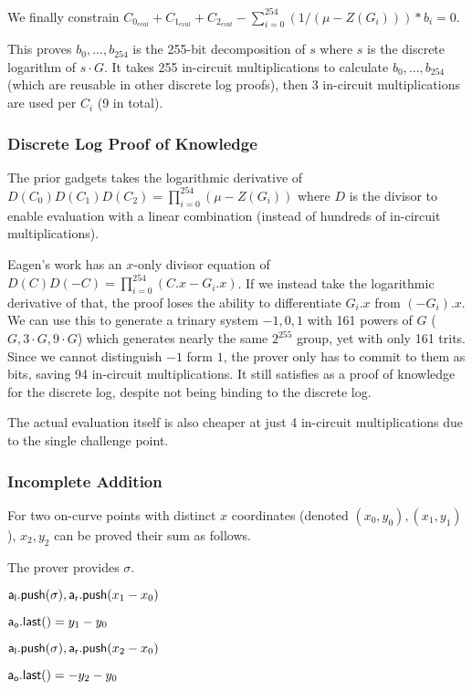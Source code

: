 \documentclass[]{article}
\begin{document}
We finally constrain $C_{0_{eval}} + C_{1_{eval}} + C_{2_{eval}} - \sum_{i=0}^{254} (1 / (\mu - Z(G_i))) * b_i = 0$.

This proves $b_0, ..., b_{254}$ is the 255-bit decomposition of $s$ where $s$ is the discrete logarithm of $s \cdot G$. It takes 255 in-circuit multiplications to calculate $b_0, ..., b_{254}$ (which are reusable in other discrete log proofs), then 3 in-circuit multiplications are used per $C_i$ (9 in total).

\subsubsection{Discrete Log Proof of Knowledge}

The prior gadgets takes the logarithmic derivative of $D(C_0)D(C_1)D(C_2) = \prod_{i=0}^{254}(\mu - Z(G_i))$ where $D$ is the divisor to enable evaluation with a linear combination (instead of hundreds of in-circuit multiplications).

Eagen's work has an $x$-only divisor equation of $D(C)D(-C) = \prod_{i=0}^{254}(C.x - G_i.x)$. If we instead take the logarithmic derivative of that, the proof loses the ability to differentiate $G_i.x$ from $(-G_i).x$. We can use this to generate a trinary system $-1, 0, 1$ with 161 powers of $G$ ($G, 3 \cdot G, 9 \cdot G$) which generates nearly the same $2^{255}$ group, yet with only 161 trits. Since we cannot distinguish $-1$ form $1$, the prover only has to commit to them as bits, saving 94 in-circuit multiplications. It still satisfies as a proof of knowledge for the discrete log, despite not being binding to the discrete log.

The actual evaluation itself is also cheaper at just 4 in-circuit multiplications due to the single challenge point.

\subsubsection{Incomplete Addition}

For two on-curve points with distinct $x$ coordinates (denoted $(x_0, y_0), (x_1, y_1)$), $x_2, y_2$ can be proved their sum as follows.

The prover provides $\sigma$.

$\mathsf{a_l.push}(\sigma), \mathsf{a_r.push}(x_1 - x_0)$

$\mathsf{a_o.last()} = y_1 - y_0$

$\mathsf{a_l.push}(\sigma), \mathsf{a_r.push}(x_2 - x_0)$

$\mathsf{a_o.last()} = -y_2 - y_0$
\end{document}
